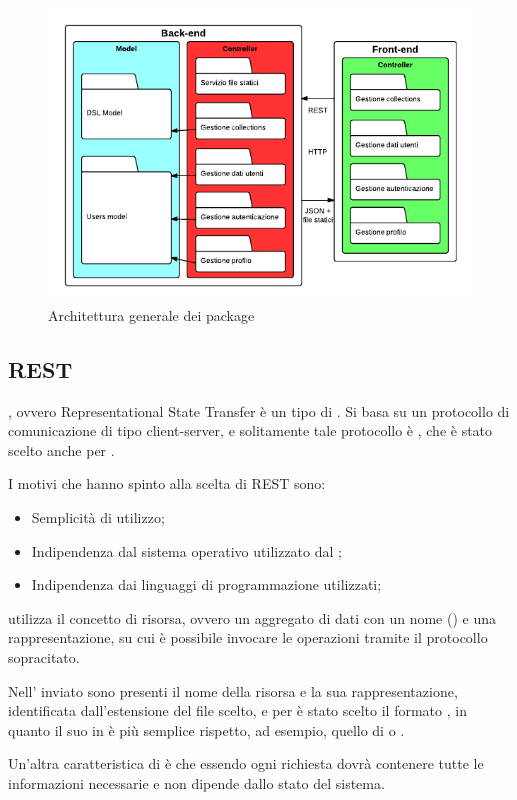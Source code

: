 \begin{figure}[H]
\centering
\includegraphics[width=\textwidth]{uml/architettura-generale-package.png}
\caption{Architettura generale dei package}
\label{architetturaGeneralePackage}
\end{figure}

\subsection{REST}

, ovvero Representational State Transfer è un tipo di . Si basa su un protocollo di comunicazione  di tipo client-server, e solitamente tale protocollo è , che è stato scelto anche per \ProjectName.

I motivi che hanno spinto alla scelta di REST sono:
\begin{itemize}
\item Semplicità di utilizzo;
\item Indipendenza dal sistema operativo utilizzato dal ;
\item Indipendenza dai linguaggi di programmazione utilizzati;
\end{itemize}

 utilizza il concetto di risorsa, ovvero un aggregato di dati con un nome () e una rappresentazione, su cui è possibile invocare le operazioni  tramite il protocollo sopracitato.

Nell' inviato sono presenti il nome della risorsa e la sua rappresentazione, identificata dall'estensione del file scelto, e per \ProjectName{} è stato scelto il formato , in quanto il suo  in  è più semplice rispetto, ad esempio, quello di  o .

Un'altra caratteristica di  è che essendo  ogni richiesta dovrà contenere tutte le informazioni necessarie e non dipende dallo stato del sistema.